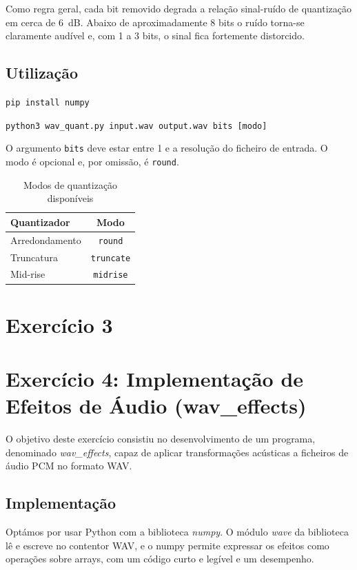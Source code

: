 \documentclass[11pt,a4paper]{report}
\begin{document}
Como regra geral, cada bit removido degrada a relação sinal-ruído de quantização em cerca de 6~dB. Abaixo de aproximadamente 8 bits o ruído torna-se claramente audível e, com 1 a 3 bits, o sinal fica fortemente distorcido.

\subsection{Utilização}

\texttt{pip install numpy}

\texttt{python3 wav\_quant.py input.wav output.wav bits [modo]}

O argumento \texttt{bits} deve estar entre 1 e a resolução do ficheiro de entrada. O modo é opcional e, por omissão, é \texttt{round}.

\begin{table}[H]
\centering
\label{tab:modos_quant}
\begin{tabular}{lc}
\toprule
Quantizador & Modo \\
\midrule
Arredondamento & \texttt{round} \\
Truncatura & \texttt{truncate} \\
Mid-rise & \texttt{midrise} \\
\bottomrule
\end{tabular}
\caption{Modos de quantização disponíveis}
\end{table}

\section{Exercício 3}

\section{Exercício 4: Implementação de Efeitos de Áudio (wav\_effects)}

O objetivo deste exercício consistiu no desenvolvimento de um programa, denominado \emph{wav\_effects}, capaz de aplicar transformações acústicas a ficheiros de áudio PCM no formato WAV. 

\subsection{Implementação}

Optámos por usar Python com a biblioteca \emph{numpy}. O módulo \emph{wave} da biblioteca lê e escreve no contentor WAV, e o numpy permite expressar os efeitos como operações sobre arrays, com um código curto e legível e um desempenho.
\end{document}
